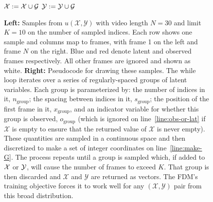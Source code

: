 \begin{figure}
\begin{minipage}[t]{0.63\textwidth}
\begin{algorithm}[H]
\begin{algorithmic}[1]
            \State {}
         \label{line:obs-or-lat}
            \State $\mathcal{X} := \mathcal{X} \cup \mathcal{G}$
        \Else
            \State $\mathcal{Y} := \mathcal{Y} \cup \mathcal{G}$
        \EndIf
    \EndWhile
    \end{algorithmic}
\end{algorithm}
\end{minipage}
\caption{\textbf{Left:} Samples from $u(\mathcal{X},\mathcal{Y})$ with video length $N=30$ and limit $K=10$ on the number of sampled indices. Each row shows one sample and columns map to frames, with frame 1 on the left and frame $N$ on the right. Blue and red denote latent and observed frames respectively. All other frames are ignored and shown as white. \textbf{Right:} Pseudocode for drawing these samples. The while loop iterates over a series of regularly-spaced groups of latent variables. Each group is parameterized by: the number of indices in it, $n_\text{group}$; the spacing between indices in it, $s_\text{group}$; the position of the first frame in it, $x_\text{group}$, and an indicator variable for whether this group is observed, $o_\text{group}$ (which is ignored on line~\ref{line:obs-or-lat} if $\mathcal{X}$ is empty to ensure that the returned value of $\mathcal{X}$ is never empty). These quantities are sampled in a continuous space and then discretized to make a set of integer coordinates on line~\ref{line:make-G}. The process repeats until a group is sampled which, if added to $\mathcal{X}$ or $\mathcal{Y}$, will cause the number of frames to exceed $K$. That group is then discarded and $\mathcal{X}$ and $\mathcal{Y}$ are returned as vectors. The FDM's training objective forces it to work well for any $(\mathcal{X},\mathcal{Y})$ pair from this broad distribution.
}
\label{fig:training-distribution}
\end{figure}

